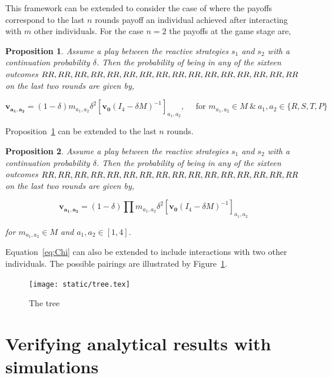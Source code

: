 \documentclass[11pt]{article}
\newcommand{\splitatcommas}[1]{%
  \begingroup
  \begingroup\lccode`~=`, \lowercase{\endgroup
    \edef~{\mathchar\the\mathcode`, \penalty0 \noexpand\hspace{0pt plus 1em}}%
  }\mathcode`,="8000 #1%
  \endgroup
}
\theoremstyle{plainCl1}
\newtheorem{Prop}{Proposition}
\theoremstyle{plainCl2}
\begin{document}
This framework can be extended to consider the case of where the payoffs
correspond to the last \(n\) rounds payoff an individual achieved after
interacting with \(m\) other individuals. For the case \(n=2\) the payoffs
at the game stage are,

\begin{Prop}\label{proposition:last_two_rounds}
Assume a play between the reactive strategies \(s_1\) and \(s_2\) with a
continuation probability \(\delta\). Then the probability of being in any of the
sixteen outcomes \(\splitatcommas{RR, RR, RR, RR, RR, RR, RR, RR, RR, RR, RR, RR, RR, RR, RR, RR}\)
on the last two rounds are given by,

\begin{equation}
  \mathbf{v_{a_1, a_2}} = (1 - \delta) m_{a_1, a_2} \delta^2 \left[\mathbf{v_0}(I_4 - \delta M)^{-1}\right]_{a_1, a_2}, \quad \text{ for } m_{a_1, a_2} \in M \ \& \ a_1, a_2 \in \{R, S, T, P\}
\end{equation}

\end{Prop}

Proposition~\ref{proposition:last_two_rounds} can be extended to the last \(n\)
rounds.

\begin{Prop}\label{proposition:last_n_rounds}
Assume a play between the reactive strategies \(s_1\) and \(s_2\) with a
continuation probability \(\delta\). Then the probability of being in any of the
sixteen outcomes \(\splitatcommas{RR, RR, RR, RR, RR, RR, RR, RR, RR, RR, RR, RR, RR, RR, RR, RR}\)
on the last two rounds are given by,

\begin{equation}
  \mathbf{v_{a_1, a_2}} = (1 - \delta) \prod m_{a_1, a_2} \delta^2 \left[\mathbf{v_0}(I_4 - \delta M)^{-1}\right]_{a_1, a_2}
\end{equation}

for \(m_{a_1, a_2} \in M\) and \(a_1, a_2 \in [1, 4]\).
\end{Prop}

Equation~\ref{eq:Chi} can also be extended to include interactions with two other
individuals. The possible pairings are illustrated by Figure~\ref{}.


\begin{figure}[!htbp]
  \centering
  \texttt{[image: static/tree.tex]}
  \caption{The tree}\label{fig:two_pairs}
\end{figure}


\section{Verifying analytical results with simulations}
\end{document}
